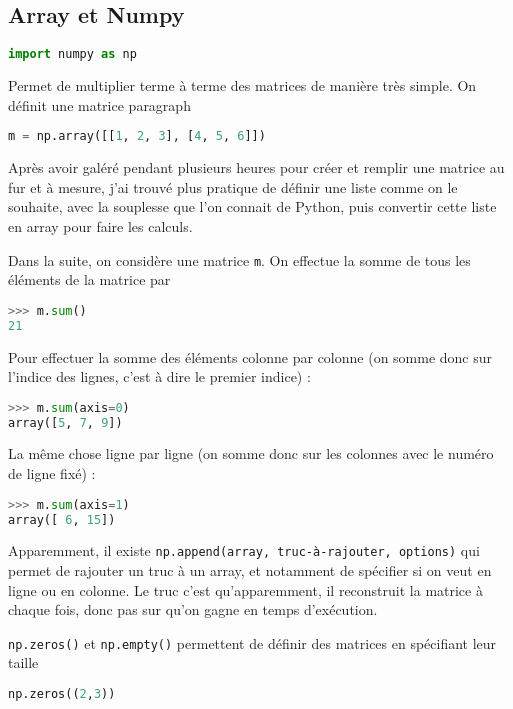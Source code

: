 \documentclass[a4paper,twoside]{article}
\begin{document}
\subsection{Array et Numpy}
\begin{lstlisting}[language=python]
import numpy as np
\end{lstlisting}

Permet de multiplier terme à terme des matrices de manière très simple. On définit une matrice paragraph
\begin{lstlisting}[language=python]
m = np.array([[1, 2, 3], [4, 5, 6]])
\end{lstlisting}

Après avoir galéré pendant plusieurs heures pour créer et remplir une matrice au fur et à mesure, j'ai trouvé plus pratique de définir une liste comme on le souhaite, avec la souplesse que l'on connait de Python, puis convertir cette liste en array pour faire les calculs.

\bigskip

Dans la suite, on considère une matrice \texttt{m}. On effectue la somme de tous les éléments de la matrice par
\begin{lstlisting}[language=python]
>>> m.sum()
21
\end{lstlisting}

Pour effectuer la somme des éléments colonne par colonne (on somme donc sur l'indice des lignes, c'est à dire le premier indice) :
\begin{lstlisting}[language=python]
>>> m.sum(axis=0)
array([5, 7, 9])
\end{lstlisting}

La même chose ligne par ligne (on somme donc sur les colonnes avec le numéro de ligne fixé) :
\begin{lstlisting}[language=python]
>>> m.sum(axis=1)
array([ 6, 15])
\end{lstlisting}

\begin{remarque}
Apparemment, il existe \texttt{np.append(array, truc-à-rajouter, options)} qui permet de rajouter un truc à un array, et notamment de spécifier si on veut en ligne ou en colonne. Le truc c'est qu'apparemment, il reconstruit la matrice à chaque fois, donc pas sur qu'on gagne en temps d'exécution.
\end{remarque}

\texttt{np.zeros()} et \texttt{np.empty()} permettent de définir des matrices en spécifiant leur taille
\begin{lstlisting}[language=python]
np.zeros((2,3))
\end{lstlisting}
\end{document}
